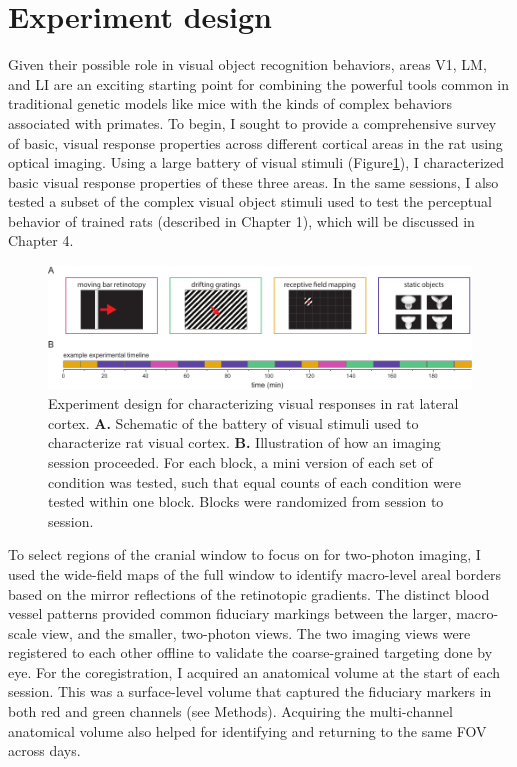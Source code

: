 \section{Experiment design}
Given their possible role in visual object recognition behaviors, areas V1, LM, and LI are an exciting starting point for combining the powerful tools common in traditional genetic models like mice with the kinds of complex behaviors associated with primates. To begin, I sought to provide a comprehensive survey of basic, visual response properties across different cortical areas in the rat using optical imaging. Using a large battery of visual stimuli (Figure\ref{fig:experiment_design}), I characterized basic visual response properties of these three areas. In the same sessions, I also tested a subset of the complex visual object stimuli used to test the perceptual behavior of trained rats (described in Chapter 1), which will be discussed in Chapter 4. 

\begin{figure}
    \includegraphics[width=\textwidth]{figures/chapter_3/fig_3-1_experiment_design/fig_3-1_experiment_design.pdf}
    \vspace{.1in}
    \caption[Experiment design]{Experiment design for characterizing visual responses in rat lateral cortex. 
    \textbf{A.} Schematic of the battery of visual stimuli used to characterize rat visual cortex. 
    \textbf{B.} Illustration of how an imaging session proceeded. For each block, a mini version of each set of condition was tested, such that equal counts of each condition were tested within one block. Blocks were randomized from session to session. 
    \label{fig:experiment_design}}
\end{figure}

To select regions of the cranial window to focus on for two-photon imaging, I used the wide-field maps of the full window to identify macro-level areal borders based on the mirror reflections of the retinotopic gradients. The distinct blood vessel patterns provided common fiduciary markings between the larger, macro-scale view, and the smaller, two-photon views. The two imaging views were registered to each other offline to validate the coarse-grained targeting done by eye. For the coregistration, I acquired an anatomical volume at the start of each session. This was a surface-level volume that captured the fiduciary markers in both red and green channels (see Methods). Acquiring the multi-channel anatomical volume also helped for identifying and returning to the same FOV across days. 

